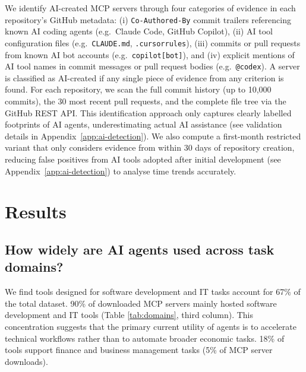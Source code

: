 \documentclass[manuscript,screen,nonacm,oneside]{acmart}
\begin{document}
We identify AI-created MCP servers through four categories of evidence in each repository's GitHub metadata: (i) \texttt{Co-Authored-By} commit trailers referencing known AI coding agents (e.g.\ Claude Code, GitHub Copilot), (ii) AI tool configuration files (e.g.\ \texttt{CLAUDE.md}, \texttt{.cursorrules}), (iii) commits or pull requests from known AI bot accounts (e.g.\ \texttt{copilot[bot]}), and (iv) explicit mentions of AI tool names in commit messages or pull request bodies (e.g.\ \texttt{@codex}). A server is classified as AI-created if any single piece of evidence from any criterion is found. For each repository, we scan the full commit history (up to 10,000 commits), the 30 most recent pull requests, and the complete file tree via the GitHub REST API. This identification approach only captures clearly labelled footprints of AI agents, underestimating actual AI assistance (see validation details in Appendix~\ref{app:ai-detection}). We also compute a first-month restricted variant that only considers evidence from within 30 days of repository creation, reducing false positives from AI tools adopted after initial development (see Appendix~\ref{app:ai-detection}) to analyse time trends accurately.

\section{Results}
\label{sec:results}
\subsection{How widely are AI agents used across task domains?}

We find tools designed for software development and IT tasks account for 67\% of the total dataset. 90\% of downloaded MCP servers mainly hosted software development and IT tools (Table \ref{tab:domains}, third column). This concentration suggests that the primary current utility of agents is to accelerate technical workflows rather than to automate broader economic tasks. 18\% of tools support finance and business management tasks (5\% of MCP server downloads).
\end{document}
